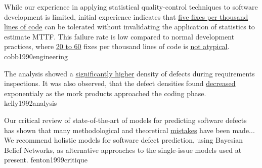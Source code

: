 \documentclass{article}
\begin{document}
  {While our experience in applying statistical quality-control techniques to software development is limited, initial experience indicates that \ul{five fixes per thousand lines of code} can be tolerated without invalidating the application of statistics to estimate MTTF. This failure rate is low compared to normal development practices, where \ul{20 to 60} fixes per thousand lines of code is \ul{not atypical}.}
  {cobb1990engineering}

  {The analysis showed a \ul{significantly higher} density of defects during requirements inspections. It was also observed, that the defect densities found \ul{decreased} exponentialy as the mork products approached the coding phase.}
  {kelly1992analysis}

  {Our critical review of state-of-the-art of models for predicting software defects has shown that many methodological and theoretical \ul{mistakes} have been made... We recommend holistic models for software defect prediction, using Bayesian Belief Networks, as alternative approaches to the single-issue models used at present.}
  {fenton1999critique}

\end{document}
